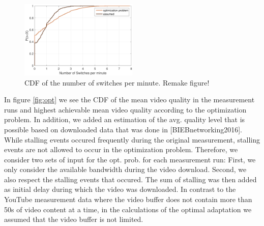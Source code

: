 \begin{figure}[t]
\centering
\includegraphics[width=0.5\textwidth]{figs/switches}%
\caption{CDF of the number of switches per minute. Remake figure!}
\label{fig:switches}%
\end{figure}

In figure \ref{fig:opt} we see the CDF of the mean video quality in the measurement runs and highest achievable mean video quality according to the optimization problem. In addition, we added an estimation of the avg. quality level that is possible based on downloaded data that was done in [BIEBnetworking2016]. While stalling events occured frequently during the original measurement, stalling events are not allowed to occur in the optimization problem. Therefore, we consider two sets of input for the opt. prob. for each measurement run: First, we only consider the available bandwidth during the video download. Second, we also respect the stalling events that occured. The sum of stalling was then added as initial delay during which the video was downloaded. In contrast to the YouTube measurement data where the video buffer does not contain more than 50s of video content at a time, in the calculations of the optimal adaptation we assumed that the video buffer is not limited.
